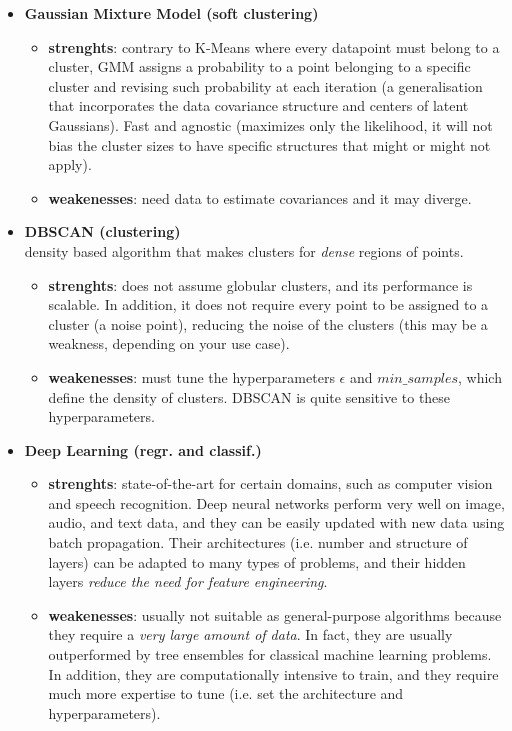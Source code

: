 \documentclass[11pt]{article}
\begin{document}
\begin{itemize}
\begin{itemize}
	\end{itemize}
	\item \textbf{Gaussian Mixture Model (soft clustering)}
	\begin{itemize}
		\item \textbf{strenghts}: contrary to K-Means where every datapoint must belong to a cluster, GMM assigns a probability to a point belonging to a specific cluster and revising such probability at each iteration (a generalisation that incorporates the data covariance structure and centers of latent Gaussians). Fast and agnostic (maximizes only the likelihood, it will not bias the cluster sizes to have specific structures that might or might not apply).
		\item \textbf{weakenesses}: need data to estimate covariances and it may diverge.
	\end{itemize}
	\item \textbf{DBSCAN (clustering)} \\
	density based algorithm that makes clusters for \textit{dense} regions of points.
	\begin{itemize}
		\item \textbf{strenghts}: does not assume globular clusters, and its performance is scalable. In addition, it does not require every point to be assigned to a cluster (a noise point), reducing the noise of the clusters (this may be a weakness, depending on your use case).
		\item \textbf{weakenesses}:  must tune the hyperparameters $\epsilon$ and $min\_samples$, which define the density of clusters. DBSCAN is quite sensitive to these hyperparameters.
	\end{itemize}
	\item \textbf{Deep Learning (regr. and classif.)}
	\begin{itemize}
		\item \textbf{strenghts}: state-of-the-art for certain domains, such as computer vision and speech recognition. Deep neural networks perform very well on image, audio, and text data, and they can be easily updated with new data using batch propagation. Their architectures (i.e. number and structure of layers) can be adapted to many types of problems, and their hidden layers \textit{reduce the need for feature engineering}.
		\item \textbf{weakenesses}:  usually not suitable as general-purpose algorithms because they require a \textit{very large amount of data}. In fact, they are usually outperformed by tree ensembles for classical machine learning problems. In addition, they are computationally intensive to train, and they require much more expertise to tune (i.e. set the architecture and hyperparameters).
	\end{itemize}
\end{itemize}
\end{document}
